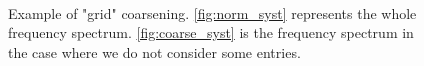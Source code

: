 \documentclass[11pt,a4paper]{article}
\begin{document}
\begin{figure}[h!]
	\centering
	 \hspace{0.2cm}               
	\\
 	\caption{Example of "grid" coarsening. \ref{fig:norm_syst} represents the whole frequency spectrum. \ref{fig:coarse_syst} is the frequency spectrum in the case where we do not consider some entries.}\label{fig:coarsening}
\end{figure}
\end{document}
